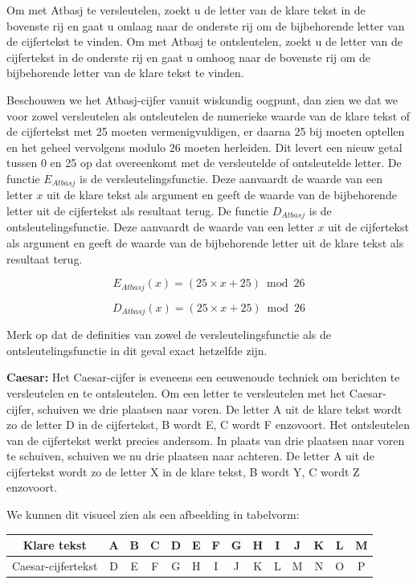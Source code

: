\normalsize

Om met Atbasj te versleutelen, zoekt u de letter van de klare tekst in de bovenste rij en gaat u omlaag naar de onderste rij om de bijbehorende letter van de cijfertekst te vinden. Om met Atbasj te ontsleutelen, zoekt u de letter van de cijfertekst in de onderste rij en gaat u omhoog naar de bovenste rij om de bijbehorende letter van de klare tekst te vinden.

Beschouwen we het Atbasj-cijfer vanuit wiskundig oogpunt, dan zien we dat we voor zowel versleutelen als ontsleutelen de numerieke waarde van de klare tekst of de cijfertekst met 25 moeten vermenigvuldigen, er daarna 25 bij moeten optellen en het geheel vervolgens modulo 26 moeten herleiden. Dit levert een nieuw getal tussen 0 en 25 op dat overeenkomt met de versleutelde of ontsleutelde letter. De functie $E_{Atbasj}$ is de versleutelingsfunctie. Deze aanvaardt de waarde van een letter $x$ uit de klare tekst als argument en geeft de waarde van de bijbehorende letter uit de cijfertekst als resultaat terug. De functie $D_{Atbasj}$ is de ontsleutelingsfunctie. Deze aanvaardt de waarde van een letter $x$ uit de cijfertekst als argument en geeft de waarde van de bijbehorende letter uit de klare tekst als resultaat terug.

\[
  E_{Atbasj}(x) = (25 \times x + 25) \bmod 26
\]

\[
  D_{Atbasj}(x) = (25 \times x + 25) \bmod 26
\]

Merk op dat de definities van zowel de versleutelingsfunctie als de ontsleutelingsfunctie in dit geval exact hetzelfde zijn.

{\bf Caesar:} Het Caesar-cijfer is eveneens een eeuwenoude techniek om berichten te versleutelen en te ontsleutelen. Om een letter te versleutelen met het Caesar-cijfer, schuiven we drie plaatsen naar voren. De letter A uit de klare tekst wordt zo de letter D in de cijfertekst, B wordt E, C wordt F enzovoort. Het ontsleutelen van de cijfertekst werkt precies andersom. In plaats van drie plaatsen naar voren te schuiven, schuiven we nu drie plaatsen naar achteren. De letter A uit de cijfertekst wordt zo de letter X in de klare tekst, B wordt Y, C wordt Z enzovoort.

We kunnen dit visueel zien als een afbeelding in tabelvorm:

\Large
\begin{center}
  \begin{tabular}{|c|c|c|c|c|c|c|c|c|c|c|c|c|c|}
  \hline
    Klare tekst & A & B & C & D & E & F & G & H & I & J & K & L & M \\ \hline	Caesar-cijfertekst & D & E & F & G & H & I & J & K & L & M & N & O & P \\ \hline
  \end{tabular}
\end{center}

